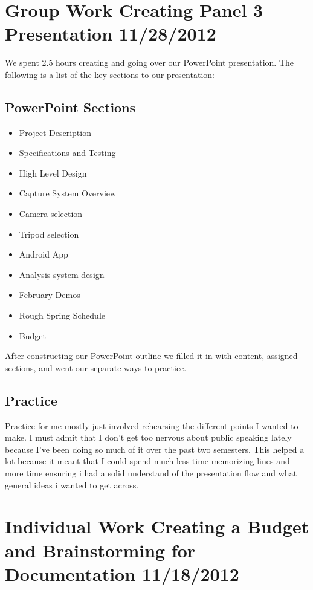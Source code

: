 \documentclass[]{article}
\begin{document}
	\tableofcontents
	\newpage
	
	
	\section{Group Work Creating Panel 3 Presentation 11/28/2012}
	
	We spent 2.5 hours creating and going over our PowerPoint presentation. The following is a list of the key sections to our presentation: \\
	
		\subsection{PowerPoint Sections}	
			\begin{itemize}
				\item Project Description
				\item Specifications and Testing
				\item High Level Design
				\item Capture System Overview
				\item Camera selection
				\item Tripod selection
				\item Android App
				\item Analysis system design
				\item February Demos
				\item Rough Spring Schedule
				\item Budget
			\end{itemize}
			
			After constructing our PowerPoint outline we filled it in with content, assigned sections, and went our separate ways to practice.			
			
		\subsection{Practice}
			Practice for me mostly just involved rehearsing the different points I wanted to make. I must admit that I don't get too nervous about public speaking lately because I've been doing so much of it over the past two semesters. This helped a lot because it meant that I could spend much less time memorizing lines and more time ensuring i had a solid understand of the presentation flow and what general ideas i wanted to get across.
		
	
	\section{Individual Work Creating a Budget and Brainstorming for Documentation 11/18/2012}
	
\end{document}
